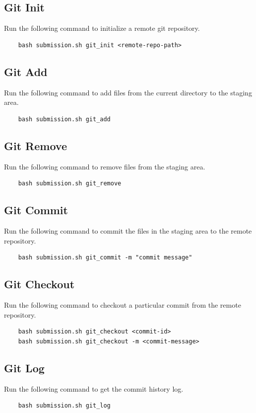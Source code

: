 \documentclass{article}
\begin{document}
\subsection{Git Init}
Run the following command to initialize a remote git repository.
\begin{verbatim}
    bash submission.sh git_init <remote-repo-path>
\end{verbatim}

\subsection{Git Add}
Run the following command to add files from the current directory to the staging area.
\begin{verbatim}
    bash submission.sh git_add
\end{verbatim}

\subsection{Git Remove}
Run the following command to remove files from the staging area.
\begin{verbatim}
    bash submission.sh git_remove
\end{verbatim}

\subsection{Git Commit}
Run the following command to commit the files in the staging area to the remote repository.
\begin{verbatim}
    bash submission.sh git_commit -m "commit message"
\end{verbatim}

\subsection{Git Checkout}
Run the following command to checkout a particular commit from the remote repository.
\begin{verbatim}
    bash submission.sh git_checkout <commit-id> 
    bash submission.sh git_checkout -m <commit-message>
\end{verbatim}
\newpage

\subsection{Git Log}
Run the following command to get the commit history log.
\begin{verbatim}
    bash submission.sh git_log
\end{verbatim}
\end{document}
